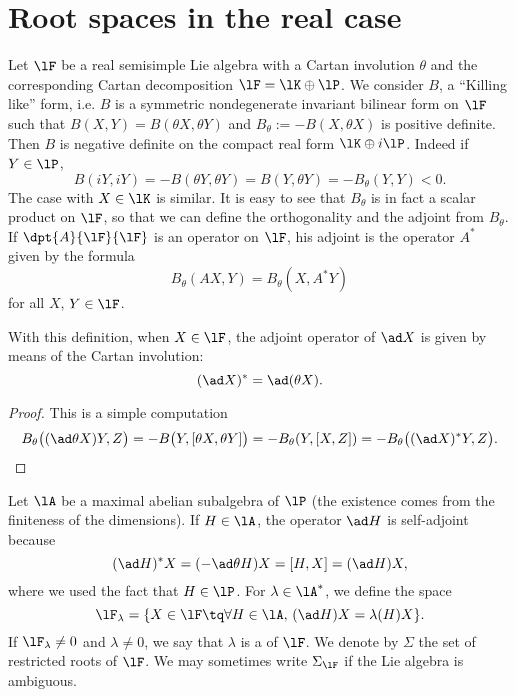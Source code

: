 \section{Root spaces in the real case}

Let $\lF$ be a real semisimple Lie algebra with a Cartan involution $\theta$ and the corresponding Cartan decomposition $\lF=\lK\oplus\lP$. We consider $B$, a ``Killing like''{} form, i.e. $B$ is a symmetric nondegenerate invariant bilinear form on $\lF$ such that $B(X,Y)=B(\theta X,\theta Y)$ and $B_{\theta}:=-B(X,\theta X)$ is positive definite. Then $B$ is negative definite on the compact real form $\lK\oplus i\lP$. Indeed if $Y\in\lP$,
\begin{equation}
  B(iY,iY)=-B(\theta Y,\theta Y)
          =B(Y,\theta Y)
      =-B_{\theta}(Y,Y)<0.
\end{equation}
The case with $X\in\lK$ is similar. It is easy to see that $B_{\theta}$ is in fact a scalar product on $\lF$, so that we can define the orthogonality and the adjoint from $B_{\theta}$. If $\dpt{A}{\lF}{\lF}$ is an operator on $\lF$, his adjoint is the operator $A^*$ given by the formula
\[
   B_{\theta}(A X,Y)=B_{\theta}(X,A^*Y)
\]
for all $X$, $Y\in\lF$.

\begin{proposition}
With this definition, when $X\in\lF$, the adjoint operator of $\ad X$ is given by means of the Cartan involution:
\[ 
(\ad X)^*= \ad(\theta X). 
\]
\end{proposition}

\begin{proof}
This is a simple computation
\begin{equation}
B_{\theta}\big(  (\ad\theta X)Y,Z \big)=-B\big(  Y,[\theta X,\theta Y]  \big)
                                     =-B_{\theta}(Y,[X,Z])
                     =-B_{\theta}\big( (\ad X)^*Y,Z \big).
\end{equation}
\end{proof}

Let $\lA$ be a maximal abelian subalgebra of $\lP$ (the existence comes from the finiteness of the dimensions). If $H\in\lA$, the operator $\ad H$ is self-adjoint because
\begin{equation}
(\ad H)^*X=(-\ad\theta H)X
          =[H,X]
      =(\ad H)X,
\end{equation}
where we used the fact that $H\in\lP$.  For $\lambda\in\lA^*$, we define the space
\begin{equation}
  \lF_{\lambda}=\{ X\in\lF\tq\forall H\in\lA,\, (\ad H)X=\lambda(H)X\}.
\end{equation}
If $\lF_{\lambda}\neq 0$ and $\lambda\neq 0$, we say that $\lambda$ is a  of $\lF$. We denote by $\Sigma$ the set of restricted roots of $\lF$. We may sometimes write $\Sigma_{\lF}$ if the Lie algebra is ambiguous.

